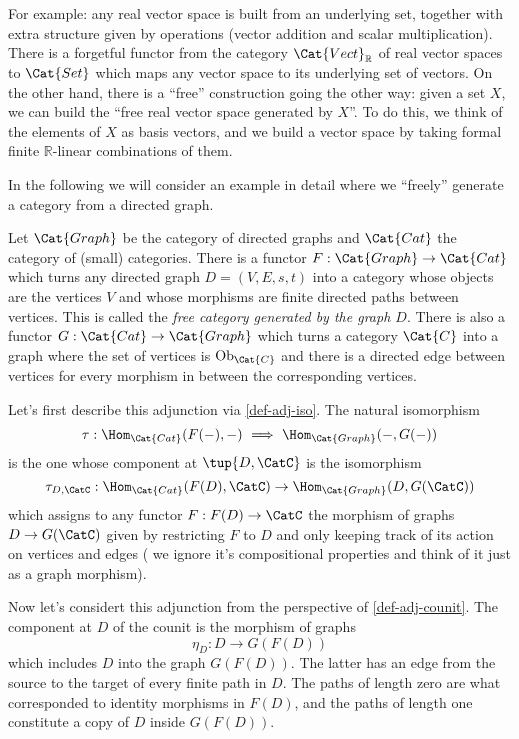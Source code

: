 For example: any real vector space is built from an underlying set, together with extra structure given by operations (vector addition and scalar multiplication). There is a forgetful functor from the category $\Cat{Vect}_{\mathbb{R}}$ of real vector spaces to $\Cat{Set}$ which maps any vector space to its underlying set of vectors. On the other hand, there is a ``free'' construction going the other way: given a set $X$, we can build the ``free real vector space generated by $X$''. To do this, we think of the elements of $X$ as basis vectors, and we build a vector space by taking formal finite $\mathbb{R}$-linear combinations of them. 

In the following we will consider an example in detail where we ``freely'' generate a category from a directed graph. 


Let  $\Cat{Graph}$ be the category of directed graphs and $\Cat{Cat}$ the category  of (small) categories. 
There is a functor $F : \Cat{Graph} \rightarrow \Cat{Cat}$ which turns any directed graph $D = (V,E, s,t)$ into a category whose objects are the vertices $V$ and whose morphisms are finite directed paths between vertices. This is called the \emph{free category generated by the graph $D$}. There is also a functor $G : \Cat{Cat} \rightarrow \Cat{Graph}$ which turns a category $\Cat{C}$ into a graph where the set of vertices is $\text{Ob}_{\Cat{C}}$ and there is a directed edge between vertices for every morphism in \CatC between the corresponding vertices. 

Let's first describe this adjunction via \cref{def-adj-iso}. The natural isomorphism 
$$\tau: \Hom_{\Cat{Cat}}(F(- ), - ) \ \Longrightarrow\  \Hom_{\Cat{Graph}}(- , G( - ))$$ 
is the one whose component at $\tup{D,\CatC}$ is the isomorphism 
$$
\tau_{D,\CatC} : \Hom_{\Cat{Cat}}(F(D), \CatC) \rightarrow \Hom_{\Cat{Graph}}(D, G(\CatC))
$$
which assigns to any functor $F: F(D) \rightarrow \CatC$ the morphism of graphs $D \rightarrow G(\CatC)$ given by restricting $F$ to $D$ and only keeping track of its action on vertices and edges ( we ignore it's compositional properties and think of it just as a graph morphism).  

Now let's considert this adjunction from the perspective of \cref{def-adj-counit}. The component at $D$ of the counit is the morphism of graphs 
$$
\eta_D : D \longrightarrow  G(F(D))
$$
which includes $D$ into the graph $G(F(D))$. The latter has an edge from the source to the target of every finite path in $D$. The paths of length zero are what corresponded to identity morphisms in $F(D)$, and the paths of length one constitute a copy of $D$ inside $G(F(D))$. 

